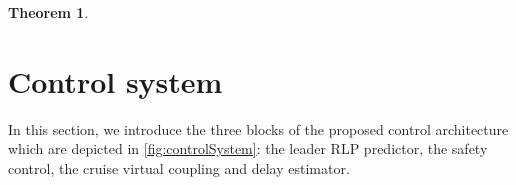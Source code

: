 \documentclass[letterpaper, 10 pt, conference]{ieeeconf}
\newcounter{Definition}
\theoremstyle{definition}
\theoremstyle{nopoint}
\newtheorem{theorem}{Theorem}[section]
\newcounter{Theorem}
\begin{document}
\begin{theorem}
%
%
%
%
%
%
\end{theorem}







\section{Control system}
 \label{sec:controlsystem}

\begin{comment}
	\textcolor{red}{Mettere qui la parte di descrizione dell'archiettura di controllo. Questa parte va aggiustata e uniformata a quello che segue. Eviterei nomi troppo pomposi. L'architettura di controllo comprende: leader RLP predictor block, safety control block, cruise virtual coupling control block (che noi ipotizziamo come switching a livelli). Questi tre blocchi sono studiati in tre diverse sezioni del paper. Qui si dà un'introduzione generale all'architettura. Questo pezzo va quindi riscritto secondo quanto sviluppato nel seguito.} 
\end{comment}


In this section, we introduce the three blocks of the proposed control architecture which are depicted in \ref{fig:controlSystem}: the leader RLP predictor, the safety control, the cruise virtual coupling and delay estimator.
 
\end{document}
